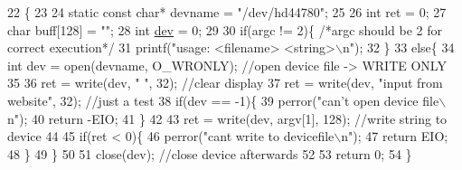 \begin{DoxyCode}
22                                \{
23 
24 \textcolor{keyword}{static} \textcolor{keyword}{const} \textcolor{keywordtype}{char}* devname = \textcolor{stringliteral}{"/dev/hd44780"};
25 
26 \textcolor{keywordtype}{int} ret = 0;
27 \textcolor{keywordtype}{char} buff[128] = \textcolor{stringliteral}{""};
28 \textcolor{keywordtype}{int} \hyperlink{hd44780_8c_a8910285a0352a5c710e65ec9ecbe32a1}{dev} = 0;
29 
30 \textcolor{keywordflow}{if}(argc != 2)\{ \textcolor{comment}{/*argc should be 2 for correct execution*/}
31     printf(\textcolor{stringliteral}{"usage:  <filename> <string>\(\backslash\)n"});
32 \}
33 \textcolor{keywordflow}{else}\{   
34     \textcolor{keywordtype}{int} dev = open(devname, O\_WRONLY);  \textcolor{comment}{//open device file -> WRITE ONLY}
35     
36     ret = write(dev, \textcolor{stringliteral}{"                                "}, 32);   \textcolor{comment}{//clear display}
37     ret = write(dev, \textcolor{stringliteral}{"input from website"}, 32);     \textcolor{comment}{//just a test }
38     \textcolor{keywordflow}{if}(dev == -1)\{
39         perror(\textcolor{stringliteral}{"can't open device file\(\backslash\)n"});
40         \textcolor{keywordflow}{return} -EIO;
41     \}
42 
43     ret = write(dev, argv[1], 128);     \textcolor{comment}{//write string to device}
44 
45     \textcolor{keywordflow}{if}(ret < 0)\{
46         perror(\textcolor{stringliteral}{"cant write to devicefile\(\backslash\)n"});
47         \textcolor{keywordflow}{return} EIO;
48     \}
49 \}
50 
51 close(dev);     \textcolor{comment}{//close device afterwards}
52 
53 \textcolor{keywordflow}{return} 0;
54 \}
\end{DoxyCode}
